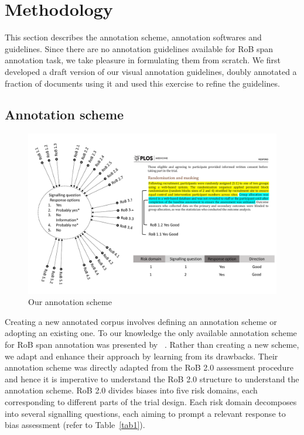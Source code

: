 \documentclass[sn-mathphys,Numbered]{sn-jnl}%
\theoremstyle{thmstyleone}%
\theoremstyle{thmstyletwo}%
\theoremstyle{thmstylethree}%
\begin{document}
\section{Methodology}
\label{sec:methods}
%
This section describes the annotation scheme, annotation softwares and guidelines.
Since there are no annotation guidelines available for RoB span annotation task, we take pleasure in formulating them from scratch. 
We first developed a draft version of our visual annotation guidelines, doubly annotated a fraction of documents using it and used this exercise to refine the guidelines.
%
%
%
\subsection{Annotation scheme}
\label{met:annot_scheme}
%

%
%
%
\begin{figure}
    \centering
    \includegraphics[width=0.99\columnwidth]{figures/annotation_schema.pdf}
    \caption{Our annotation scheme}
    \label{fig:annotationscheme}
\end{figure}
%
%
%



Creating a new annotated corpus involves defining an annotation scheme or adopting an existing one.
To our knowledge the only available annotation scheme for RoB span annotation was presented by ~\cite{dhrangadhariya2023first}.
Rather than creating a new scheme, we adapt and enhance their approach by learning from its drawbacks.
Their annotation scheme was directly adapted from the RoB 2.0 assessment procedure and hence it is imperative to understand the RoB 2.0 structure to understand the annotation scheme.
RoB 2.0 divides biases into five risk domains, each corresponding to different parts of the trial design.
Each risk domain decomposes into several signalling questions, each aiming to prompt a relevant response to bias assessment (refer to Table~\ref{tab1}).
\end{document}
